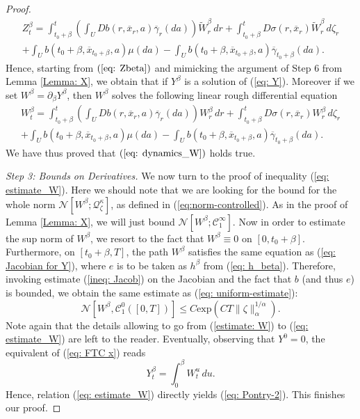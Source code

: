 \documentclass[12pt,reqno]{amsart}
\numberwithin{equation}{section}  %
\newcommand{\1}{{\bf 1}}
\newcommand{\2}{{\bf 2}}
\newcommand{\ga}{\gamma}
\newcommand{\ka}{\kappa}
\newcommand{\lp}{\left(}
\newcommand{\rp}{\right)}
\theoremstyle{remark}
\theoremstyle{remark}
\begin{document}
\begin{proof}
\begin{multline}\label{eq: Zbeta}
    Z^{\beta}_{t}=\int_{t_{0}+\beta}^{t}\lp\int_{U}Db(r,\overline{x}_{r},a)\overline{\ga}_{r}(da) \rp \tilde{W}^{\beta}_{r}\,dr +\int_{t_{0}+\beta}^{t}D\sigma(r,\overline{x}_{r})\tilde{W}^{\beta}_{r}\, d\zeta_{r}\\
+\int_{U}b(t_{0}+\beta,\overline{x}_{t_{0}+\beta},a)\mu(da)-\int_{U}b(t_{0}+\beta,\overline{x}_{t_{0}+\beta},a)\overline{\ga}_{t_{0}+\beta}(da).
\end{multline}
Hence, starting from $(\ref{eq: Zbeta})$ and mimicking the argument of Step 6 from Lemma \ref{Lemma: X}, we obtain that if $Y^{\beta}$ is a solution of (\ref{eq: Y}). Moreover if we set $W^{\beta}=\partial_{\beta}Y^{\beta}$, then $W^{\beta}$ solves the following linear rough differential equation
\begin{multline}
W^{\beta}_{t}=\int_{t_{0}+\beta}^{t}\lp\int_{U}Db(r,\overline{x}_{r},a)\overline{\ga}_{r}(da) \rp W_{r}^{\beta}\,dr +\int_{t_{0}+\beta}^{t}D\sigma(r,\overline{x}_{r})W^{\beta}_{r}\, d\zeta_{r}\\
+\int_{U}b(t_{0}+\beta,\overline{x}_{t_{0}+\beta},a)\mu(da)-\int_{U}b(t_{0}+\beta,\overline{x}_{t_{0}+\beta},a)\overline{\ga}_{t_{0}+\beta}(da).
\end{multline}
We have thus proved that $(\ref{eq: dynamics_W})$ holds true.

\smallskip

\noindent
\textit{Step 3: Bounds on Derivatives.}
  We now turn to the proof of inequality (\ref{eq: estimate_W}). Here we should note that we are looking for the bound for the whole norm $\mathcal{N}[W^{\beta}; \mathcal{Q}_{\zeta}^{\ka}]$, as defined in (\ref{eq:norm-controlled}). As in the proof of Lemma \ref{Lemma: X}, we will just bound $\mathcal{N}[W^{\beta};\mathcal{C}_{1}^{\infty}]$. Now in order to estimate the sup norm of $W^{\beta}$, we resort to the fact that $W^{\beta}\equiv 0$ on $[0,t_{0}+\beta]$. Furthermore, on $[t_{0}+\beta,T]$, the path $W^{\beta}$ satisfies the same equation as (\ref{eq: Jacobian for Y}), where $e$ is to be taken as $h^{\beta}$ from (\ref{eq: h_beta}).
    Therefore, invoking estimate (\ref{ineq: Jacob}) on the Jacobian and the fact that $b$ (and thus $e$) is bounded, we obtain the same estimate as (\ref{eq: uniform-estimate}):
\begin{equation}\label{estimate: W}\mathcal{N}[W^{\beta},\mathcal{C}_{1}^{0}([0,T])]\leq C\mathrm{exp}(CT\|\zeta\|_{\alpha}^{1/\alpha}).\end{equation}
Note again that the details allowing to go from (\ref{estimate: W}) to (\ref{eq: estimate_W}) are left to the reader. Eventually, observing that $Y^{0}=0$, the equivalent of (\ref{eq: FTC x}) reads
\[Y^{\beta}_{t}=\int_{0}^{\beta}W^{u}_{t}\,du.\]
Hence, relation (\ref{eq: estimate_W}) directly yields (\ref{eq: Pontry-2}). This finishes our proof.\end{proof}
\end{document}
